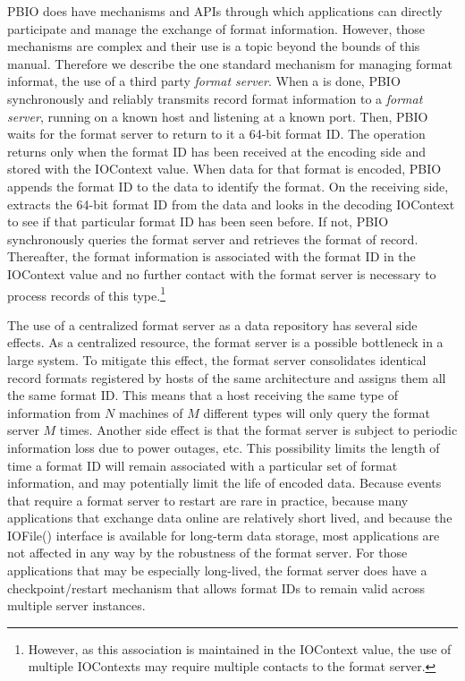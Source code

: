 PBIO does have mechanisms and APIs through which applications can directly
participate and manage the exchange of format information.  However, those
mechanisms are complex and their use is a topic beyond the bounds of this
manual.  Therefore we describe the one standard mechanism for managing
format informat, the use of a third party {\it format server}.  When a
 is done, PBIO synchronously and
reliably transmits record format information to a {\it format server},
running on a known host and listening at a known port.  Then, PBIO waits for
the format server to return to it a 64-bit format ID.  The
 operation returns only when the
format ID has been received at the encoding side and stored with the
IOContext value.  When data for that format is encoded, PBIO appends the
format ID to the data to identify the format.  On the receiving side,
 extracts the 64-bit format ID from the
data and looks in the decoding IOContext to see if that particular format ID
has been seen before.  If not, PBIO synchronously queries the format server
and retrieves the format of record.  Thereafter, the format information is
associated with the format ID in the IOContext value and no further contact
with the format server is necessary to process records of this
type.\footnote{However, as this association is maintained in the IOContext
value, the use of multiple IOContexts may require multiple contacts to the
format server.}

The use of a centralized format server as a data repository has several side
effects.  As a centralized resource, the format server is a possible
bottleneck in a large system.  To mitigate this effect, the format server
consolidates identical record formats registered by hosts of the same
architecture and assigns them all the same format ID.  This means that a
host receiving the same type of information from $N$ machines of $M$
different types will only query the format server $M$ times.  Another side
effect is that the format server is subject to periodic information loss due
to power outages, etc.  This possibility limits the length of time a format
ID will remain associated with a particular set of format information, and
may potentially limit the life of encoded data.  Because events that require
a format server to restart are rare in practice, because many applications
that exchange data online are relatively short lived, and because 
the IOFile() interface is available for long-term data storage, most
applications are not affected in any way by the robustness of the format
server.  For those applications that may be especially long-lived, the
format server does have a checkpoint/restart mechanism that allows format
IDs to remain valid across multiple server instances.

